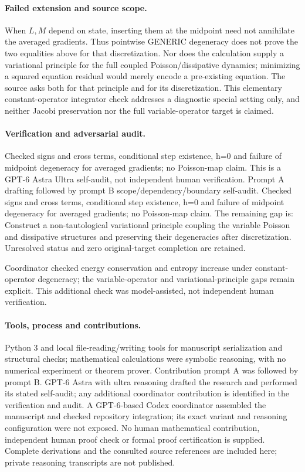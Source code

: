 \documentclass[11pt]{article}
\begin{document}
\paragraph{Failed extension and source scope.} When \(L,M\) depend on state, inserting them at the midpoint need not annihilate the averaged gradients. Thus pointwise GENERIC degeneracy does not prove the two equalities above for that discretization. Nor does the calculation supply a variational principle for the full coupled Poisson/dissipative dynamics; minimizing a squared equation residual would merely encode a pre-existing equation. The source asks both for that principle and for its discretization. This elementary constant-operator integrator check addresses a diagnostic special setting only, and neither Jacobi preservation nor the full variable-operator target is claimed.

\paragraph{Verification and adversarial audit.}
Checked signs and cross terms, conditional step existence, h=0 and failure of midpoint degeneracy for averaged gradients; no Poisson-map claim. This is a GPT-6 Astra Ultra self-audit, not independent human verification. Prompt A drafting followed by prompt B scope/dependency/boundary self-audit. Checked signs and cross terms, conditional step existence, h=0 and failure of midpoint degeneracy for averaged gradients; no Poisson-map claim. The remaining gap is: Construct a non-tautological variational principle coupling the variable Poisson and dissipative structures and preserving their degeneracies after discretization. Unresolved status and zero original-target completion are retained.

Coordinator checked energy conservation and entropy increase under constant-operator degeneracy; the variable-operator and variational-principle gaps remain explicit. This additional check was model-assisted, not independent human verification.

\paragraph{Tools, process and contributions.}
Python 3 and local file-reading/writing tools for manuscript serialization and structural checks; mathematical calculations were symbolic reasoning, with no numerical experiment or theorem prover. Contribution prompt A was followed by prompt B. GPT-6 Astra with ultra reasoning drafted the research and performed its stated self-audit; any additional coordinator contribution is identified in the verification and audit. A GPT-6-based Codex coordinator assembled the manuscript and checked repository integration; its exact variant and reasoning configuration were not exposed. No human mathematical contribution, independent human proof check or formal proof certification is supplied. Complete derivations and the consulted source references are included here; private reasoning transcripts are not published.
\end{document}
